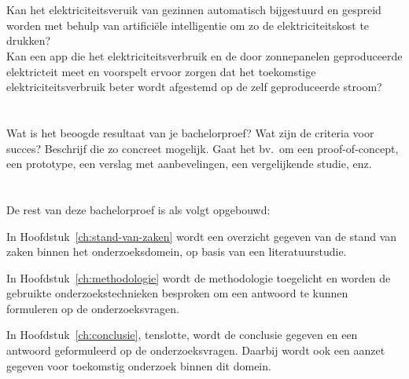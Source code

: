 \section{}%
\label{sec:onderzoeksvraag}


Kan het elektriciteitsveruik van gezinnen automatisch bijgestuurd en gespreid worden met behulp van artificiële intelligentie om zo de elektriciteitskost te drukken? \\

Kan een app die het elektriciteitsverbruik en de door zonnepanelen geproduceerde elektricteit meet en voorspelt ervoor zorgen dat het toekomstige elektriciteitsverbruik beter wordt afgestemd op de zelf geproduceerde stroom? \\

\section{}%
\label{sec:onderzoeksdoelstelling}

Wat is het beoogde resultaat van je bachelorproef? Wat zijn de criteria voor succes? Beschrijf die zo concreet mogelijk. Gaat het bv.\ om een proof-of-concept, een prototype, een verslag met aanbevelingen, een vergelijkende studie, enz.

\section{}%
\label{sec:opzet-bachelorproef}


De rest van deze bachelorproef is als volgt opgebouwd:

In Hoofdstuk~\ref{ch:stand-van-zaken} wordt een overzicht gegeven van de stand van zaken binnen het onderzoeksdomein, op basis van een literatuurstudie.

In Hoofdstuk~\ref{ch:methodologie} wordt de methodologie toegelicht en worden de gebruikte onderzoekstechnieken besproken om een antwoord te kunnen formuleren op de onderzoeksvragen.


In Hoofdstuk~\ref{ch:conclusie}, tenslotte, wordt de conclusie gegeven en een antwoord geformuleerd op de onderzoeksvragen. Daarbij wordt ook een aanzet gegeven voor toekomstig onderzoek binnen dit domein.